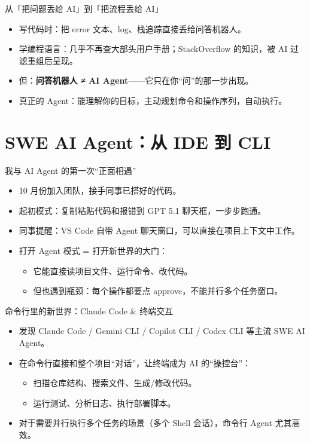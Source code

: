 \documentclass[10pt,aspectratio=169]{beamer}
\begin{document}
\begin{frame}{从「把问题丢给 AI」到「把流程丢给 AI」}
  \begin{itemize}
    \item 写代码时：把 error 文本、log、栈追踪直接丢给问答机器人。
    \item 学编程语言：几乎不再查大部头用户手册；StackOverflow 的知识，被 AI 过滤重组后呈现。
    \item 但：\textbf{问答机器人 ≠ AI Agent}——它只在你“问”的那一步出现。
    \item 真正的 Agent：能理解你的目标，主动规划命令和操作序列，自动执行。
  \end{itemize}
\end{frame}

\section{SWE AI Agent：从 IDE 到 CLI}

\begin{frame}{我与 AI Agent 的第一次“正面相遇”}
  \begin{itemize}
    \item 10 月份加入团队，接手同事已搭好的代码。
    \item 起初模式：复制粘贴代码和报错到 GPT 5.1 聊天框，一步步跑通。
    \item 同事提醒：VS Code 自带 Agent 聊天窗口，可以直接在项目上下文中工作。
    \item 打开 Agent 模式 = 打开新世界的大门：
      \begin{itemize}
        \item 它能直接读项目文件、运行命令、改代码。
        \item 但也遇到瓶颈：每个操作都要点 approve，不能并行多个任务窗口。
      \end{itemize}
  \end{itemize}
\end{frame}

\begin{frame}{命令行里的新世界：Claude Code \& 终端交互}
  \begin{itemize}
    \item 发现 Claude Code / Gemini CLI / Copilot CLI / Codex CLI 等主流 SWE AI Agent。
    \item 在命令行直接和整个项目“对话”，让终端成为 AI 的“操控台”：
      \begin{itemize}
        \item 扫描仓库结构、搜索文件、生成/修改代码。
        \item 运行测试、分析日志、执行部署脚本。
      \end{itemize}
    \item 对于需要并行执行多个任务的场景（多个 Shell 会话），命令行 Agent 尤其高效。
  \end{itemize}
\end{frame}
\end{document}
